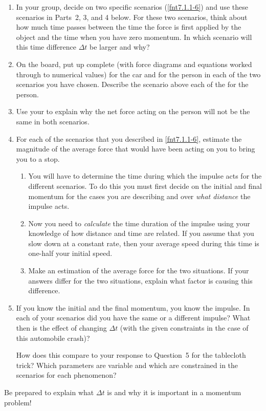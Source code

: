 \begin{enumerate}
	\item In your group, decide on two specific scenarios (\ref{fnt7.1.1-6}) and use these scenarios in Parts~2, 3, and 4 below. For these two scenarios, think about how much time passes between the time the force is first applied by the object and the time when you have zero momentum. In which scenario will this time difference $\Delta t$ be larger and why?
	
	\item  On the board, put up complete \pcharts{} (with force diagrams and equations worked through to numerical values) for the car and for the person in each of the two scenarios you have chosen. Describe the scenario above each of the \pcharts{} for the person.
	
	\item Use your \pcharts{} to explain why the net force acting on the person will not be the same in both scenarios.
	
	\item For each of the scenarios that you described in \ref{fnt7.1.1-6}, estimate the magnitude of the average force that would have been acting on you to bring you to a stop.
	\begin{enumerate}
		\item You will have to determine the time during which the impulse acts for the different scenarios. To do this you must first decide on the initial and final momentum for the cases you are describing and over \emph{what distance} the impulse acts.
		
		\item Now you need to \emph{calculate} the time duration of the impulse using your knowledge of how distance and time are related. If you assume that you slow down at a constant rate, then your average speed during this time is one-half your initial speed.
		
		\item Make an estimation of the average force for the two situations. If your answers differ for the two situations, explain what factor is causing this difference.
	\end{enumerate}
	
	\item If you know the initial and the final momentum, you know the impulse. In each of your scenarios did you have the same or a different impulse? What then is the effect of changing $\Delta t$ (with the given constraints in the case of this automobile crash)?
	
	How does this compare to your response to Question~5 for the tablecloth trick? Which parameters are variable and which are constrained in the scenarios for each phenomenon?
\end{enumerate}

Be prepared to explain what $\Delta t$ is and why it is important in a momentum problem!

\vspace{8pt}
\WCD
